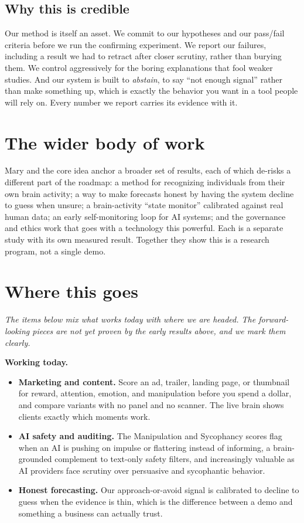 \documentclass[11pt]{article}
\begin{document}
\subsection{Why this is credible}

Our method is itself an asset. We commit to our hypotheses and our pass/fail criteria before
we run the confirming experiment. We report our failures, including a result we had to
retract after closer scrutiny, rather than burying them. We control aggressively for the
boring explanations that fool weaker studies. And our system is built to \emph{abstain},
to say ``not enough signal'' rather than make something up, which is exactly the behavior you
want in a tool people will rely on. Every number we report carries its evidence with it.

\section{The wider body of work}

Mary and the core idea anchor a broader set of results, each of which de-risks a different
part of the roadmap: a method for recognizing individuals from their own brain activity; a way
to make forecasts honest by having the system decline to guess when unsure; a brain-activity
``state monitor'' calibrated against real human data; an early self-monitoring loop for AI
systems; and the governance and ethics work that goes with a technology this powerful. Each is
a separate study with its own measured result. Together they show this is a research program,
not a single demo.

\section{Where this goes}

\textit{The items below mix what works today with where we are headed. The forward-looking
pieces are not yet proven by the early results above, and we mark them clearly.}

\textbf{Working today.}
\begin{itemize}
\item \textbf{Marketing and content.} Score an ad, trailer, landing page, or thumbnail for
reward, attention, emotion, and manipulation before you spend a dollar, and compare variants
with no panel and no scanner. The live brain shows clients exactly which moments work.
\item \textbf{AI safety and auditing.} The Manipulation and Sycophancy scores flag when an AI
is pushing on impulse or flattering instead of informing, a brain-grounded complement to
text-only safety filters, and increasingly valuable as AI providers face scrutiny over
persuasive and sycophantic behavior.
\item \textbf{Honest forecasting.} Our approach-or-avoid signal is calibrated to decline to
guess when the evidence is thin, which is the difference between a demo and something a
business can actually trust.
\end{itemize}
\end{document}
